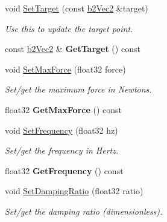 \begin{DoxyCompactItemize}
void \mbox{\hyperlink{classb2MouseJoint_a96f34c1c990407eddbadf07ae359b1f3}{Set\+Target}} (const \mbox{\hyperlink{structb2Vec2}{b2\+Vec2}} \&target)
\begin{DoxyCompactList}\small\item\em Use this to update the target point. \end{DoxyCompactList}\item 
\mbox{\label{classb2MouseJoint_a9904bbdf5b73f49954f37c27c983d715}} 
const \mbox{\hyperlink{structb2Vec2}{b2\+Vec2}} \& {\bfseries Get\+Target} () const
\item 
\mbox{\label{classb2MouseJoint_a4beba6ea0827960fac2474563591c03a}} 
void \mbox{\hyperlink{classb2MouseJoint_a4beba6ea0827960fac2474563591c03a}{Set\+Max\+Force}} (float32 force)
\begin{DoxyCompactList}\small\item\em Set/get the maximum force in Newtons. \end{DoxyCompactList}\item 
\mbox{\label{classb2MouseJoint_a61c9fbd78498d3484f824876654eb015}} 
float32 {\bfseries Get\+Max\+Force} () const
\item 
\mbox{\label{classb2MouseJoint_a8b37706535923637ca280c5a0467b14d}} 
void \mbox{\hyperlink{classb2MouseJoint_a8b37706535923637ca280c5a0467b14d}{Set\+Frequency}} (float32 hz)
\begin{DoxyCompactList}\small\item\em Set/get the frequency in Hertz. \end{DoxyCompactList}\item 
\mbox{\label{classb2MouseJoint_a97b9264cc357ac96e447990f52086719}} 
float32 {\bfseries Get\+Frequency} () const
\item 
\mbox{\label{classb2MouseJoint_a648c8f3ecb82f4887c0eefcfe48cbd37}} 
void \mbox{\hyperlink{classb2MouseJoint_a648c8f3ecb82f4887c0eefcfe48cbd37}{Set\+Damping\+Ratio}} (float32 ratio)
\begin{DoxyCompactList}\small\item\em Set/get the damping ratio (dimensionless). \end{DoxyCompactList}\item 

\end{DoxyCompactItemize}
